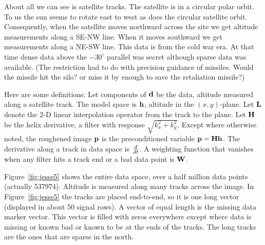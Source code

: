 About all we can see is satellite tracks.
The satellite is in a circular polar orbit.
To us the sun seems to rotate east to west
as does the circular satellite orbit.
Consequently, when the satellite moves northward across the site
we get altitude measurements along a SE-NW line.
When it moves southward we get measurements along a NE-SW line.
This data is from the cold war era.
At that time dense data above the $-30^\circ$ parallel was secret
although sparse data was available.
(The restriction had to do with precision guidance of missiles.
Would the missile hit the silo?
or miss it by enough to save the retaliation missile?)

\par
Here are some definitions:
Let components of $\bold d$ be the data,
altitude measured along a satellite track.
The model space is $\bold h$, altitude in the $(x,y)$-plane.
Let $\bold L$ denote the 2-D linear interpolation operator
from the track to the plane.
Let $\bold H$ be the helix derivative,
a filter with response $\sqrt{k_x^2+k_y^2}$.
Except where otherwise noted,
the roughened image $\bold p$ is the preconditioned variable
$\bold p =\bold H \bold h$.
The derivative along a track in data space is ${d\over dt}$.
A weighting function that vanishes when any filter hits a track end
or a bad data point is $\bold W$.

\par
Figure~\ref{fig:jesse5} shows the entire data space,
over a half million data points (actually 537974).
Altitude is measured along many tracks across the image.
In Figure~\ref{fig:jesse5} the tracks are placed end-to-end,
so it is one long vector (displayed in about 50 signal rows).
A vector of equal length is the missing data marker vector.
This vector is filled with zeros everywhere except where
data is missing or known bad or known to be at the ends of the tracks.
The long tracks are the ones that are sparse in the north.



